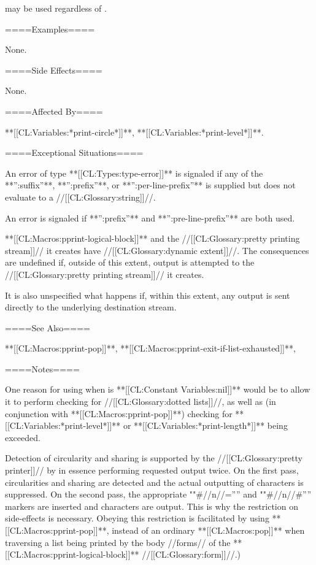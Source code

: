  may be used regardless of .

====Examples====

None.

====Side Effects====

None.

====Affected By====

**[[CL:Variables:*print-circle*]]**, **[[CL:Variables:*print-level*]]**.

====Exceptional Situations====

An error of type **[[CL:Types:type-error]]** is signaled if any of the **'':suffix''**, **'':prefix''**, or **'':per-line-prefix''** is supplied but does not evaluate to a //[[CL:Glossary:string]]//.

An error is signaled if **'':prefix''** and **'':pre-line-prefix''** are both used.

**[[CL:Macros:pprint-logical-block]]** and the //[[CL:Glossary:pretty printing stream]]// it creates have //[[CL:Glossary:dynamic extent]]//. The consequences are undefined if, outside of this extent, output is attempted to the //[[CL:Glossary:pretty printing stream]]// it creates.

It is also unspecified what happens if, within this extent, any output is sent directly to the underlying destination stream.

====See Also====

**[[CL:Macros:pprint-pop]]**, **[[CL:Macros:pprint-exit-if-list-exhausted]]**, {\secref\TildeLessThanLogicalBlock}

====Notes====

One reason for using  when  is **[[CL:Constant Variables:nil]]** would be to allow it to perform checking for //[[CL:Glossary:dotted lists]]//, as well as (in conjunction with **[[CL:Macros:pprint-pop]]**) checking for **[[CL:Variables:*print-level*]]** or **[[CL:Variables:*print-length*]]** being exceeded.

Detection of circularity and sharing is supported by the //[[CL:Glossary:pretty printer]]// by in essence performing requested output twice. On the first pass, circularities and sharing are detected and the actual outputting of characters is suppressed. On the second pass, the appropriate ""#//n//='''' and ""#//n//#'''' markers are inserted and characters are output. This is why the restriction on side-effects is necessary. Obeying this restriction is facilitated by using **[[CL:Macros:pprint-pop]]**, instead of an ordinary **[[CL:Macros:pop]]** when traversing a list being printed by the body //forms// of the **[[CL:Macros:pprint-logical-block]]** //[[CL:Glossary:form]]//.)

    
